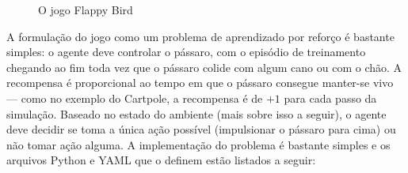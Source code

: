 \documentclass[cic,tc]{iiufrgs}
\begin{document}
\begin{figure}[h]
  \begin{center}
  \caption{O jogo Flappy Bird}
  \label{fig:flappy_bird}
\end{center}
\end{figure}


A formulação do jogo como um problema de aprendizado por reforço é bastante
simples: o agente deve controlar o pássaro, com o episódio de treinamento
chegando ao fim toda vez que o pássaro colide com algum cano ou com o chão. A
recompensa é proporcional ao tempo em que o pássaro consegue manter-se vivo ---
como no exemplo do Cartpole, a recompensa é de $+1$ para cada passo da simulação.
Baseado no estado do ambiente (mais sobre isso a seguir), o agente deve decidir
se toma a única ação possível (impulsionar o pássaro para cima) ou não tomar ação
alguma. A implementação do problema é bastante simples e os arquivos Python e
YAML que o definem estão listados a seguir:
\end{document}
